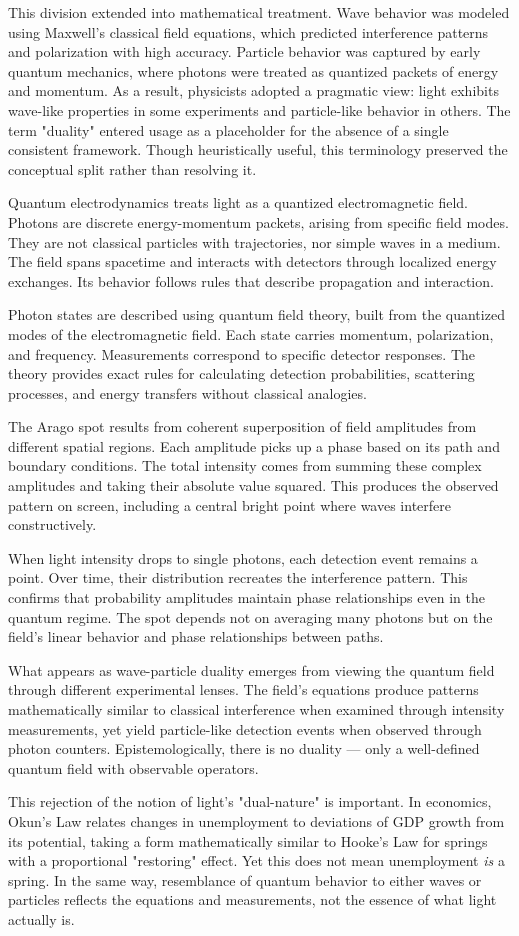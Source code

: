 This division extended into mathematical treatment. Wave behavior was modeled using Maxwell's classical field equations, which predicted interference patterns and polarization with high accuracy. Particle behavior was captured by early quantum mechanics, where photons were treated as quantized packets of energy and momentum. As a result, physicists adopted a pragmatic view: light exhibits wave-like properties in some experiments and particle-like behavior in others. The term "duality" entered usage as a placeholder for the absence of a single consistent framework. Though heuristically useful, this terminology preserved the conceptual split rather than resolving it.

Quantum electrodynamics treats light as a quantized electromagnetic field. Photons are discrete energy-momentum packets, arising from specific field modes. They are not classical particles with trajectories, nor simple waves in a medium. The field spans spacetime and interacts with detectors through localized energy exchanges. Its behavior follows rules that describe propagation and interaction.

Photon states are described using quantum field theory, built from the quantized modes of the electromagnetic field. Each state carries momentum, polarization, and frequency. Measurements correspond to specific detector responses. The theory provides exact rules for calculating detection probabilities, scattering processes, and energy transfers without classical analogies.

The Arago spot results from coherent superposition of field amplitudes from different spatial regions. Each amplitude picks up a phase based on its path and boundary conditions. The total intensity comes from summing these complex amplitudes and taking their absolute value squared. This produces the observed pattern on screen, including a central bright point where waves interfere constructively.

When light intensity drops to single photons, each detection event remains a point. Over time, their distribution recreates the interference pattern. This confirms that probability amplitudes maintain phase relationships even in the quantum regime. The spot depends not on averaging many photons but on the field's linear behavior and phase relationships between paths.

What appears as wave-particle duality emerges from viewing the quantum field through different experimental lenses. The field's equations produce patterns mathematically similar to classical interference when examined through intensity measurements, yet yield particle-like detection events when observed through photon counters. Epistemologically, there is no duality — only a well-defined quantum field with observable operators.

This rejection of the notion of light's "dual-nature" is important. In economics, Okun's Law relates changes in unemployment to deviations of GDP growth from its potential, taking a form mathematically similar to Hooke's Law for springs with a proportional "restoring" effect. Yet this does not mean unemployment \textit{is} a spring. In the same way, resemblance of quantum behavior to either waves or particles reflects the equations and measurements, not the essence of what light actually is. 